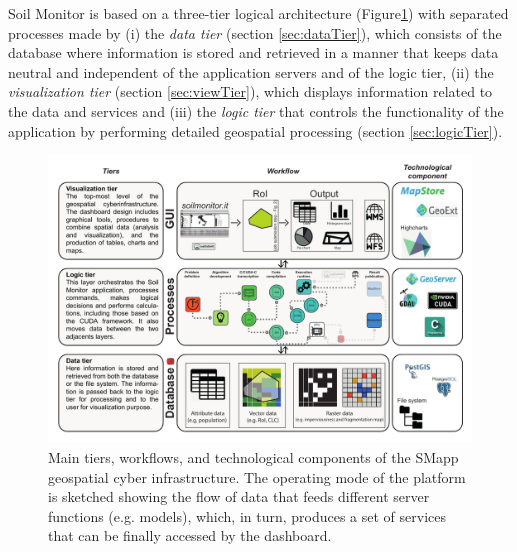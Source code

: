 \documentclass[APA,LATO1COL,doublespace]{WileyNJD-v2}
\begin{document}
Soil Monitor is based on a three-tier logical architecture (Figure\ref{fig:GCI}) with separated processes made by 
(i) 
the \textit{data tier} (section \ref{sec:dataTier}), which consists of the database where information is stored and retrieved in a manner that keeps data neutral and independent of the application servers and of the logic tier,
(ii) the \textit{visualization tier} (section \ref{sec:viewTier}), which displays information related to the data and services
and 
(iii) 
the \textit{logic tier} that controls the functionality of the application by performing detailed geospatial processing (section \ref{sec:logicTier}).

\begin{figure}[t] %
    \centerline{\includegraphics[width=500pt]{daMileti/02_infrastruttura.pdf}}
    \caption{Main tiers, workflows, and technological components of the SMapp geospatial cyber infrastructure.
    The operating mode of the platform is sketched showing the flow of data that feeds different server functions (e.g. models), which, in turn, produces a set of services that can be finally accessed by the dashboard.
    } \label{fig:GCI}
\end{figure}

\end{document}
